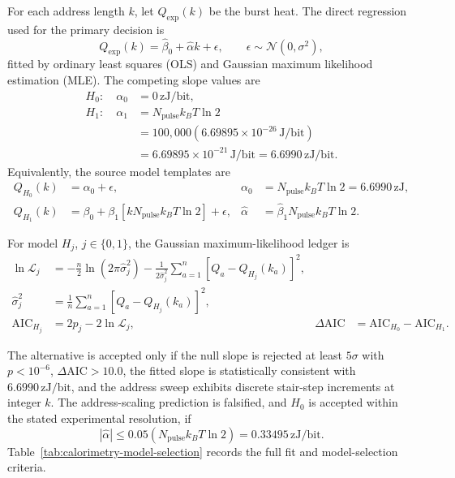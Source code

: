 \documentclass[11pt,letterpaper]{article}
\theoremstyle{plain}
\begin{document}
For each address length \(k\), let \(Q_{\text{exp}}(k)\) be the burst heat.  The
direct regression used for the primary decision is
\begin{equation}
\label{eq:calorimetry-direct-slope-fit}
 Q_{\text{exp}}(k)
 =
 \widehat{\beta}_0
 +\widehat{\alpha}k
 +\epsilon,
 \qquad
 \epsilon\sim\mathcal N(0,\sigma^2),
\end{equation}
fitted by ordinary least squares (OLS) and Gaussian maximum likelihood
estimation (MLE).  The competing slope values are
\begin{equation}
\label{eq:calorimetry-alpha-targets}
 \begin{aligned}
 H_0:\quad
 \alpha_0
 &=0\,\mathrm{zJ/bit},
 \\
 H_1:\quad
 \alpha_1
 &=N_{\text{pulse}}k_BT\ln2
 \\
 &=100{,}000
 \left(6.69895\times10^{-26}\,\mathrm{J/bit}\right)
 \\
 &=6.69895\times10^{-21}\,\mathrm{J/bit}
 =6.6990\,\mathrm{zJ/bit}.
 \end{aligned}
\end{equation}
Equivalently, the source model templates are
\begin{align}
\label{eq:calorimetry-h0-fit-template}
 Q_{H_0}(k)
 &=
 \alpha_0+\epsilon,
 &
 \alpha_0
 &=
 N_{\text{pulse}}k_BT\ln2
 =6.6990\,\mathrm{zJ},
\\
\label{eq:calorimetry-h1-fit-template}
 Q_{H_1}(k)
 &=
 \beta_0
 +\beta_1\left[kN_{\text{pulse}}k_BT\ln2\right]
 +\epsilon,
 &
 \widehat{\alpha}
 &=
 \widehat{\beta}_1N_{\text{pulse}}k_BT\ln2.
\end{align}

For model \(H_j\), \(j\in\{0,1\}\), the Gaussian maximum-likelihood ledger is
\begin{align}
\label{eq:calorimetry-gaussian-log-likelihood}
 \ln\mathcal L_j
 &=
 -\frac{n}{2}\ln(2\pi\widehat\sigma_j^2)
 -\frac{1}{2\widehat\sigma_j^2}
 \sum_{a=1}^{n}
 \left[Q_a-Q_{H_j}(k_a)\right]^2,
 \\
 \widehat\sigma_j^2
 &=
 \frac{1}{n}
 \sum_{a=1}^{n}
 \left[Q_a-Q_{H_j}(k_a)\right]^2,
 \\
\label{eq:calorimetry-aic-decision-ledger}
 \mathrm{AIC}_{H_j}
 &=2p_j-2\ln\mathcal L_j,
 &
 \Delta\mathrm{AIC}
 &=\mathrm{AIC}_{H_0}-\mathrm{AIC}_{H_1}.
\end{align}

The alternative is accepted only if the null slope is rejected at least
\(5\sigma\) with \(p<10^{-6}\),
\(\Delta\mathrm{AIC}>10.0\), the fitted slope is statistically consistent
with \(6.6990\,\mathrm{zJ/bit}\), and the address sweep exhibits discrete
stair-step increments at integer \(k\).  The address-scaling prediction is
falsified, and \(H_0\) is
accepted within the stated experimental resolution, if
\begin{equation}
\label{eq:calorimetry-falsification-band}
 |\widehat{\alpha}|
 \le
 0.05\left(N_{\text{pulse}}k_BT\ln2\right)
 =
 0.33495\,\mathrm{zJ/bit}.
\end{equation}
Table~\ref{tab:calorimetry-model-selection} records the full fit and
model-selection criteria.
\end{document}
